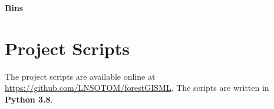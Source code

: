 \documentclass{thesis}
\begin{document}
\textbf{Bins}

\begin{figure}[h!]
	\centering
\end{figure}


\clearpage
\section{Project Scripts}\label{app:scripts}

The project scripts are available online at \url{https://github.com/LNSOTOM/forestGISML}. 
The scripts are written in \textbf{Python 3.8}.
\end{document}
